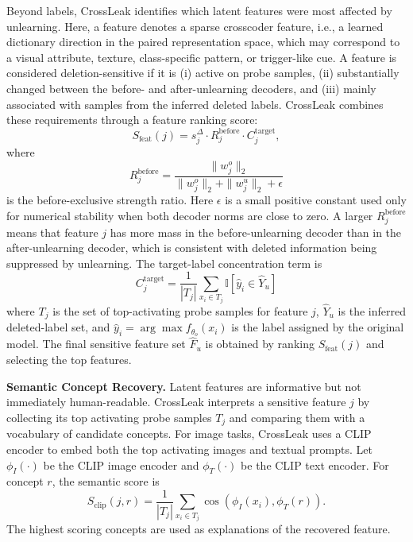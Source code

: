 Beyond labels, CrossLeak identifies which latent features were most affected by unlearning. Here, a feature denotes a sparse crosscoder feature, i.e., a learned dictionary direction in the paired representation space, which may correspond to a visual attribute, texture, class-specific pattern, or trigger-like cue. A feature is considered deletion-sensitive if it is (i) active on probe samples, (ii) substantially changed between the before- and after-unlearning decoders, and (iii) mainly associated with samples from the inferred deleted labels. CrossLeak combines these requirements through a feature ranking score:
\begin{equation}
    S_{\mathrm{feat}}(j)=
    s_j^{\Delta}\cdot
    R_j^{\mathrm{before}}\cdot
    C_j^{\mathrm{target}},
    \label{eq:feature_score}
\end{equation}
where
\begin{equation}
    R_j^{\mathrm{before}}=
    \frac{\|w_j^o\|_2}{\|w_j^o\|_2+\|w_j^u\|_2+\epsilon}
    \label{eq:before_strength}
\end{equation}
is the before-exclusive strength ratio. Here $\epsilon$ is a small positive constant used only for numerical stability when both decoder norms are close to zero. A larger $R_j^{\mathrm{before}}$ means that feature $j$ has more mass in the before-unlearning decoder than in the after-unlearning decoder, which is consistent with deleted information being suppressed by unlearning. The target-label concentration term is
\begin{equation}
    C_j^{\mathrm{target}} =
    \frac{1}{|T_j|}
    \sum_{x_i\in T_j}
    \mathbb{I}[\hat y_i\in \hat Y_u]
    \label{eq:target_coverage}
\end{equation}
where $T_j$ is the set of top-activating probe samples for feature $j$, $\hat Y_u$ is the inferred deleted-label set, and $\hat y_i=\arg\max f_{\theta_o}(x_i)$ is the label assigned by the original model. The final sensitive feature set $\hat F_u$ is obtained by ranking $S_{\mathrm{feat}}(j)$ and selecting the top features.

 


\noindent
\textbf{Semantic Concept Recovery.} Latent features are informative but not immediately human-readable. CrossLeak interprets a sensitive feature $j$ by collecting its top activating probe samples $T_j$ and comparing them with a vocabulary of candidate concepts. For image tasks, CrossLeak uses a CLIP encoder to embed both the top activating images and textual prompts. Let $\phi_I(\cdot)$ be the CLIP image encoder and $\phi_T(\cdot)$ be the CLIP text encoder. For concept $r$, the semantic score is
\begin{equation}
    S_{\mathrm{clip}}(j,r)=
    \frac{1}{|T_j|}\sum_{x_i\in T_j}
    \cos\left(\phi_I(x_i),\phi_T(r)\right).
    \label{eq:clip_concept_score}
\end{equation}
The highest scoring concepts are used as explanations of the recovered feature. 

